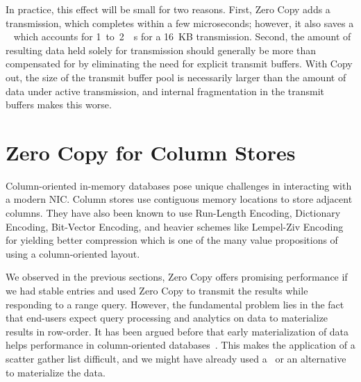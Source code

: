 In practice, this effect will be small for two reasons. First, Zero Copy adds a
transmission, which completes within a few microseconds; however, it also saves a
\memcpy~ which accounts for 1~to~2~\textmu~s for a 16~KB transmission. Second, the
amount of resulting data held solely for transmission should generally be
more than compensated for by eliminating the need for explicit transmit
buffers. With Copy out, the size of the transmit buffer pool is necessarily
larger than the amount of data under active transmission, and internal
fragmentation in the transmit buffers makes this worse.


\section{Zero Copy for Column Stores}

Column-oriented in-memory databases pose unique challenges in interacting with a modern NIC. 
Column stores use contiguous memory locations to store adjacent columns. They have also been known 
to use Run-Length Encoding, Dictionary Encoding, Bit-Vector Encoding, and heavier schemes 
like Lempel-Ziv Encoding for yielding better compression which is one of the many value 
propositions of using a column-oriented layout. 

We observed in the previous  sections, Zero Copy offers promising performance if 
we had stable entries and used Zero Copy to transmit the results while responding to a range query. 
However, the fundamental problem lies in the fact that end-users expect query processing and analytics on data 
to materialize results in row-order. It has been argued before that early materialization of data
helps performance in column-oriented databases~\cite{cstore-material}. This makes the application 
of a scatter gather list difficult, and we might have already used a \memcpy ~or an alternative 
to materialize the data. 


